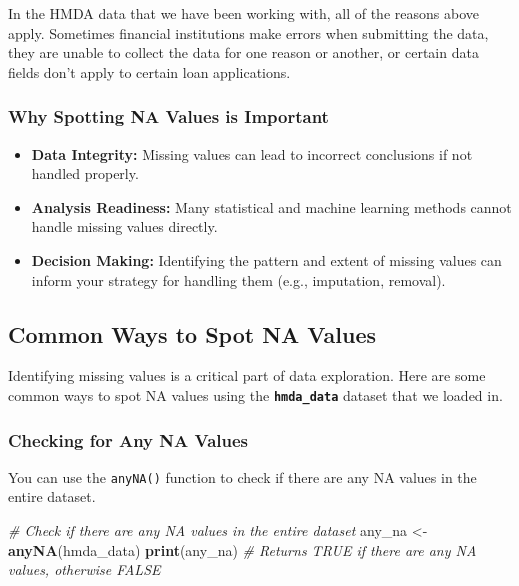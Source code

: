 \documentclass[
]{book}
\newenvironment{Shaded}{\begin{snugshade}}{\end{snugshade}}
\newcommand{\CommentTok}[1]{\textcolor[rgb]{0.56,0.35,0.01}{\textit{#1}}}
\newcommand{\FunctionTok}[1]{\textcolor[rgb]{0.13,0.29,0.53}{\textbf{#1}}}
\newcommand{\NormalTok}[1]{#1}
\newcommand{\OtherTok}[1]{\textcolor[rgb]{0.56,0.35,0.01}{#1}}
\providecommand{\tightlist}{%
  \setlength{\itemsep}{0pt}\setlength{\parskip}{0pt}}
\begin{document}
In the HMDA data that we have been working with, all of the reasons above apply. Sometimes financial institutions make errors when submitting the data, they are unable to collect the data for one reason or another, or certain data fields don't apply to certain loan applications.

\hypertarget{why-spotting-na-values-is-important}{%
\subsubsection*{Why Spotting NA Values is Important}\label{why-spotting-na-values-is-important}}

\begin{itemize}
\tightlist
\item
  \textbf{Data Integrity:} Missing values can lead to incorrect conclusions if not handled properly.
\item
  \textbf{Analysis Readiness:} Many statistical and machine learning methods cannot handle missing values directly.
\item
  \textbf{Decision Making:} Identifying the pattern and extent of missing values can inform your strategy for handling them (e.g., imputation, removal).
\end{itemize}

\hypertarget{common-ways-to-spot-na-values}{%
\subsection{Common Ways to Spot NA Values}\label{common-ways-to-spot-na-values}}

Identifying missing values is a critical part of data exploration. Here are some common ways to spot NA values using the \textbf{\texttt{hmda\_data}} dataset that we loaded in.

\hypertarget{checking-for-any-na-values}{%
\subsubsection*{Checking for Any NA Values}\label{checking-for-any-na-values}}

You can use the \texttt{anyNA()} function to check if there are any NA values in the entire dataset.

\begin{Shaded}
\begin{Highlighting}[]
\CommentTok{\# Check if there are any NA values in the entire dataset}
\NormalTok{any\_na }\OtherTok{\textless{}{-}} \FunctionTok{anyNA}\NormalTok{(hmda\_data)}
\FunctionTok{print}\NormalTok{(any\_na) }\CommentTok{\# Returns TRUE if there are any NA values, otherwise FALSE}
\end{Highlighting}
\end{Shaded}
\end{document}
